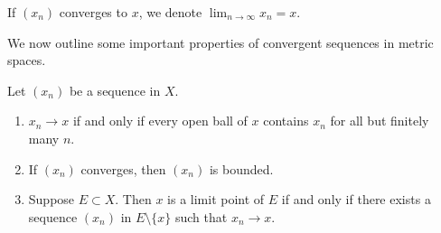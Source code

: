 \begin{notation}
If $(x_n)$ converges to $x$, we denote $\displaystyle\lim_{n\to\infty}x_n=x$.
\end{notation}

We now outline some important properties of convergent sequences in metric spaces.

\begin{proposition}
Let $(x_n)$ be a sequence in $X$.
\begin{enumerate}[label=(\roman*)]
\item $x_n\to x$ if and only if every open ball of $x$ contains $x_n$ for all but finitely many $n$.
\item If $(x_n)$ converges, then $(x_n)$ is bounded.
\item Suppose $E\subset X$. Then $x$ is a limit point of $E$ if and only if there exists a sequence $(x_n)$ in $E\setminus\{x\}$ such that $x_n\to x$.
\end{enumerate}
\end{proposition}

